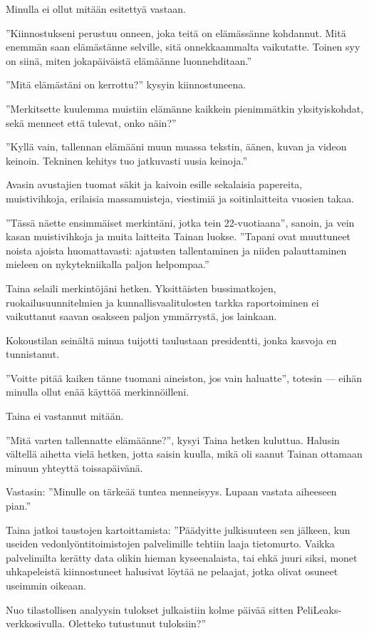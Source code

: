 ﻿\documentclass[a4paper, 12pt, finnish]{article}
\newcommand{\q}[1]{''#1''}
\begin{document}
Minulla ei ollut mitään esitettyä vastaan.

\q{Kiinnostukseni perustuu onneen, joka teitä on elämässänne kohdannut.
Mitä enemmän saan elämästänne selville, sitä onnekkaammalta vaikutatte.
Toinen syy on siinä, miten jokapäiväistä elämäänne luonnehditaan.}

\q{Mitä elämästäni on kerrottu?} kysyin kiinnostuneena.

\q{Merkitsette kuulemma muistiin elämänne kaikkein pienimmätkin
yksityiskohdat, sekä menneet että tulevat, onko näin?}

\q{Kyllä vain, tallennan elämääni muun muassa tekstin, äänen,
kuvan ja videon keinoin. Tekninen kehitys tuo jatkuvasti
uusia keinoja.}

Avasin avustajien tuomat säkit ja kaivoin esille sekalaisia
papereita, muistivihkoja, erilaisia massamuisteja, viestimiä
ja soitinlaitteita vuosien takaa.

\q{Tässä näette ensimmäiset merkintäni, jotka tein 22-vuotiaana},
sanoin, ja vein kasan muistivihkoja ja muita laitteita Tainan
luokse. \q{Tapani ovat muuttuneet noista ajoista huomattavasti:
ajatusten tallentaminen ja niiden palauttaminen mieleen on
nykytekniikalla paljon helpompaa.}

Taina selaili merkintöjäni hetken. Yksittäisten bussimatkojen,
ruokailusuunnitelmien ja kunnallisvaalitulosten tarkka raportoiminen
ei vaikuttanut saavan osakseen paljon ymmärrystä, jos lainkaan.

Kokoustilan seinältä minua tuijotti taulustaan presidentti,
jonka kasvoja en tunnistanut.

\q{Voitte pitää kaiken tänne
tuomani aineiston, jos vain haluatte}, totesin --- eihän minulla
ollut enää käyttöä merkinnöilleni.

Taina ei vastannut mitään.

\q{Mitä varten tallennatte elämäänne?}, kysyi Taina hetken kuluttua.
Halusin vältellä aihetta vielä hetken, jotta saisin kuulla,
mikä oli saanut Tainan ottamaan minuun yhteyttä
toissapäivänä.

Vastasin: \q{Minulle on tärkeää tuntea menneisyys.
Lupaan vastata aiheeseen pian.}

Taina jatkoi taustojen kartoittamista: \q{Päädyitte julkisuuteen
sen jälkeen, kun useiden vedonlyöntitoimistojen palvelimille
tehtiin laaja tietomurto. Vaikka palvelimilta kerätty data olikin
hieman kyseenalaista, tai ehkä juuri siksi, monet uhkapeleistä
kiinnostuneet halusivat löytää ne pelaajat, jotka olivat osuneet
useimmin oikeaan.

Nuo tilastollisen analyysin tulokset julkaistiin kolme päivää
sitten PeliLeaks-verkkosivulla. Oletteko tutustunut tuloksiin?}
\end{document}
